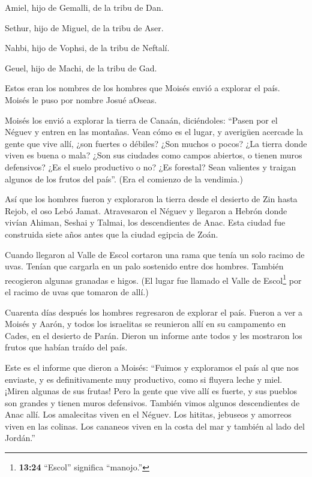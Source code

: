  Amiel, hijo de Gemalli, de la tribu de Dan.

 Sethur, hijo de Miguel, de la tribu de Aser.

 Nahbi, hijo de Vophsi, de la tribu de Neftalí.

 Geuel, hijo de Machi, de la tribu de Gad.

 Estos eran los nombres de los hombres que Moisés envió a
explorar el país. Moisés le puso por nombre Josué aOseas.

 Moisés los envió a explorar la tierra de Canaán,
diciéndoles: ``Pasen por el Néguev y entren en las montañas.
 Vean cómo es el lugar, y averigüen acercade la gente que
vive allí, ¿son fuertes o débiles? ¿Son muchos o pocos? 
¿La tierra donde viven es buena o mala? ¿Son sus ciudades como campos
abiertos, o tienen muros defensivos?  ¿Es el suelo
productivo o no? ¿Es forestal? Sean valientes y traigan algunos de los
frutos del país''. (Era el comienzo de la vendimia.)

 Así que los hombres fueron y exploraron la tierra desde el
desierto de Zin hasta Rejob, el oso Lebó Jamat. 
Atravesaron el Néguev y llegaron a Hebrón donde vivían Ahiman, Seshai y
Talmai, los descendientes de Anac. Esta ciudad fue construida siete años
antes que la ciudad egipcia de Zoán.

 Cuando llegaron al Valle de Escol cortaron una rama que
tenía un solo racimo de uvas. Tenían que cargarla en un palo sostenido
entre dos hombres. También recogieron algunas granadas e higos.
 (El lugar fue llamado el Valle de Escol\footnote{\textbf{13:24}
  ``Escol'' significa ``manojo.''} por el racimo de uvas que tomaron de
allí.)

 Cuarenta días después los hombres regresaron de explorar
el país.  Fueron a ver a Moisés y Aarón, y todos los
israelitas se reunieron allí en su campamento en Cades, en el desierto
de Parán. Dieron un informe ante todos y les mostraron los frutos que
habían traído del país.

 Este es el informe que dieron a Moisés: ``Fuimos y
exploramos el país al que nos enviaste, y es definitivamente muy
productivo, como si fluyera leche y miel. ¡Miren algunas de sus frutas!
 Pero la gente que vive allí es fuerte, y sus pueblos son
grandes y tienen muros defensivos. También vimos algunos descendientes
de Anac allí.  Los amalecitas viven en el Néguev. Los
hititas, jebuseos y amorreos viven en las colinas. Los cananeos viven en
la costa del mar y también al lado del Jordán.''

